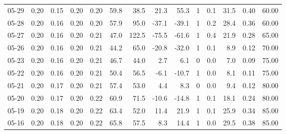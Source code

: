 \begin{threeparttable}
{\begin{tabular}{lrrrrrrrrrrrrr}
  05-29 &          0.20 &          0.15 &          0.20 &        0.20 &                59.8 &                38.5 &       21.3 &         55.3 &              1 &                 0.1 &             31.5 &            0.40 &                  60.00 \\
  05-28 &          0.20 &          0.16 &          0.20 &        0.20 &                57.9 &                95.0 &      -37.1 &        -39.1 &              1 &                 0.2 &             28.4 &            0.36 &                  60.00 \\
  05-27 &          0.20 &          0.16 &          0.20 &        0.21 &                47.0 &               122.5 &      -75.5 &        -61.6 &              1 &                 0.4 &             21.9 &            0.28 &                  65.00 \\
  05-26 &          0.20 &          0.16 &          0.20 &        0.21 &                44.2 &                65.0 &      -20.8 &        -32.0 &              1 &                 0.1 &              8.9 &            0.12 &                  70.00 \\
  05-23 &          0.20 &          0.16 &          0.20 &        0.21 &                46.7 &                44.0 &        2.7 &          6.1 &              0 &                 0.0 &              7.0 &            0.09 &                  75.00 \\
  05-22 &          0.20 &          0.16 &          0.20 &        0.21 &                50.4 &                56.5 &       -6.1 &        -10.7 &              1 &                 0.0 &              8.1 &            0.11 &                  75.00 \\
  05-21 &          0.20 &          0.17 &          0.20 &        0.21 &                57.4 &                53.0 &        4.4 &          8.3 &              0 &                 0.0 &              9.4 &            0.12 &                  80.00 \\
  05-20 &          0.20 &          0.17 &          0.20 &        0.22 &                60.9 &                71.5 &      -10.6 &        -14.8 &              1 &                 0.1 &             18.1 &            0.24 &                  80.00 \\
  05-19 &          0.20 &          0.18 &          0.20 &        0.22 &                63.4 &                52.0 &       11.4 &         21.9 &              1 &                 0.1 &             25.9 &            0.34 &                  85.00 \\
  05-16 &          0.20 &          0.18 &          0.20 &        0.22 &                65.8 &                57.5 &        8.3 &         14.4 &              1 &                 0.0 &             29.5 &            0.38 &                  85.00 \\

\end{tabular}}
\end{threeparttable}

